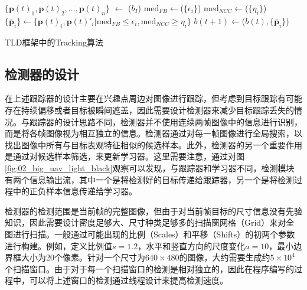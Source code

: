 \begin{algorithm2e}[ht]
	\SetAlgoLined
	\BlankLine
	$\{\mathbf{p}(t)_1, \mathbf{p}(t)_2,...,\mathbf{p}(t)_n\}$ $\leftarrow$ \Initialization($b_I$)\;	
	$\text{med}_{FB} \leftarrow$\MedianFlow($\{\epsilon_i\}$) \;
	$\text{med}_{NCC} \leftarrow$\MedianFlow($\{\eta_i\}$) \;
	$\{\bar{\mathbf{p}}_i\} \leftarrow  \{\mathbf{p}(t)_i,\mathbf{p}(t)'_i|\text{med}_{FB} \le \epsilon_i, \text{med}_{NCC} \ge \eta_i \}$\;
	$b(t+1) \leftarrow$\Transform($b(t),\{\bar{\mathbf{p}}_i\}$)\;
	\caption{TLD框架中的Tracking算法}
	\label{alg:tld_tracking}
\end{algorithm2e}


\subsection{检测器的设计}
在上述跟踪器的设计主要在兴趣点周边对图像进行跟踪，但考虑到目标跟踪有可能存在持续偏移或者目标被瞬间遮盖，因此需要设计检测器来减少目标跟踪丢失的情况。与跟踪器的设计思路不同，检测器并不使用连续两帧图像中的信息进行识别，而是将各帧图像视为相互独立的信息。检测器通过对每一帧图像进行全局搜索，以找出图像中所有与目标表观特征相似的候选样本。此外，检测器的另一个重要作用是通过对候选样本筛选，来更新学习器。这里需要注意，通过对图\ref{fig:02_big_uav_light_black}观察可以发现，与跟踪器和学习器不同，检测模块有两个信息输出流，其中一个是将检测好的目标传递给跟踪器，另一个是将检测过程中的正负样本信息传递给学习器。

检测器的检测范围是当前帧的完整图像，但由于对当前帧目标的尺寸信息没有先验知识，因此需要设计密度足够大、尺寸种类足够多的扫描窗网格（Grid）来对全图进行扫描。一般通过可能出现的比例（Scales）和平移（Shifts）的初两个参数进行构建。例如，定义比例值$s=1.2$，水平和竖直方向的尺度变化$a=10$，最小边界框大小为20个像素。针对一个尺寸为$640\times480$的图像，大约需要生成约$5\times10^4$个扫描窗口。由于对于每一个扫描窗口的检测是相对独立的，因此在程序编写的过程中，可以将上述窗口的检测通过线程设计来提高检测速度。

